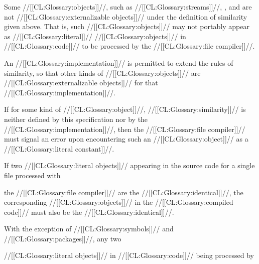 \endlist

\endsubsubsection%


Some //[[CL:Glossary:objects]]//, such as //[[CL:Glossary:streams]]//, , and 
are not //[[CL:Glossary:externalizable objects]]// under the definition of similarity given above.
That is, such //[[CL:Glossary:objects]]// may not portably appear as //[[CL:Glossary:literal]]// //[[CL:Glossary:objects]]// 
in //[[CL:Glossary:code]]// to be processed by the //[[CL:Glossary:file compiler]]//. 

An //[[CL:Glossary:implementation]]// is permitted to extend the rules of similarity, 
so that other kinds of //[[CL:Glossary:objects]]// are //[[CL:Glossary:externalizable objects]]//
for that //[[CL:Glossary:implementation]]//.

If for some kind of //[[CL:Glossary:object]]//, //[[CL:Glossary:similarity]]// is
neither defined by this specification 
	    nor by the //[[CL:Glossary:implementation]]//, 
then the //[[CL:Glossary:file compiler]]// must signal an error upon encountering such 
an //[[CL:Glossary:object]]// as a //[[CL:Glossary:literal constant]]//.

\endsubsubsection%
  

















If two //[[CL:Glossary:literal objects]]// appearing in the source code for a single file
processed with

the //[[CL:Glossary:file compiler]]// 
are the //[[CL:Glossary:identical]]//,
the corresponding //[[CL:Glossary:objects]]// in the //[[CL:Glossary:compiled code]]// 
must also be the //[[CL:Glossary:identical]]//.







With the exception of //[[CL:Glossary:symbols]]// and //[[CL:Glossary:packages]]//, any two

//[[CL:Glossary:literal objects]]//
in //[[CL:Glossary:code]]// being processed by


